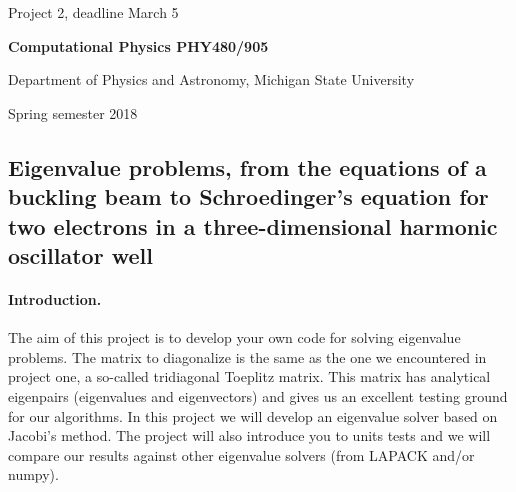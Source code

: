 \documentclass[%
oneside,                 %
final,                   %
10pt]{article}
\begin{document}

\newcommand{\exercisesection}[1]{\subsection*{#1}}






\thispagestyle{empty}

\begin{center}
{\LARGE\bf
\begin{spacing}{1.25}
Project 2, deadline March 5
\end{spacing}
}
\end{center}


\begin{center}
{\bf Computational Physics PHY480/905}
\end{center}

    \begin{center}
\centerline{{\small Department of Physics and Astronomy, Michigan State University}}
\end{center}
    

\begin{center}
Spring semester 2018
\end{center}

\vspace{1cm}


\subsection{Eigenvalue problems, from the equations of a buckling beam to Schroedinger's equation for two electrons in a three-dimensional harmonic oscillator well}

\paragraph{Introduction.}
The aim of this project is to develop your own code for solving eigenvalue problems. The matrix to diagonalize is the same as the one we encountered in project one, a so-called tridiagonal Toeplitz matrix. This matrix has analytical eigenpairs (eigenvalues and eigenvectors) and gives us an excellent testing ground for our algorithms. In this project we will develop an eigenvalue solver based on Jacobi's method. The project will also introduce you to units tests and we will compare our results against other eigenvalue solvers (from LAPACK and/or numpy). 
\end{document}
